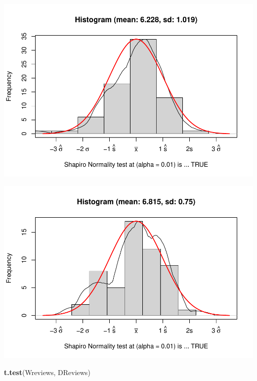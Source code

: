 \documentclass[]{article}
\newenvironment{Shaded}{\begin{snugshade}}{\end{snugshade}}
\newcommand{\KeywordTok}[1]{\textcolor[rgb]{0.13,0.29,0.53}{\textbf{#1}}}
\newcommand{\NormalTok}[1]{#1}
\newcommand{\OperatorTok}[1]{\textcolor[rgb]{0.81,0.36,0.00}{\textbf{#1}}}
\begin{document}
\includegraphics{Denzel-v-Will-data_files/figure-latex/unnamed-chunk-6-5.pdf}

\begin{Shaded}
\end{Shaded}

\includegraphics{Denzel-v-Will-data_files/figure-latex/unnamed-chunk-6-6.pdf}

\begin{Shaded}
\begin{Highlighting}[]
\KeywordTok{t.test}\NormalTok{(Wreviews, DReviews)}
\end{Highlighting}
\end{Shaded}
\end{document}
